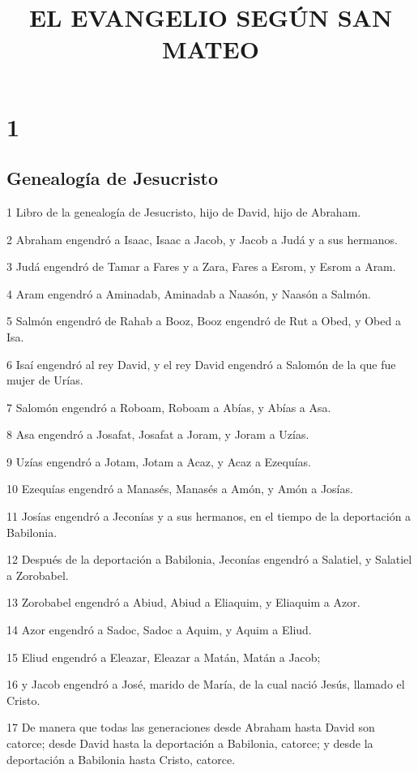 
\title{EL EVANGELIO SEGÚN SAN MATEO}

\chapter{1}

\section*{Genealogía de Jesucristo}

\par 1 Libro de la genealogía de Jesucristo, hijo de David, hijo de Abraham.
\par 2 Abraham engendró a Isaac, Isaac a Jacob, y Jacob a Judá y a sus hermanos.
\par 3 Judá engendró de Tamar a Fares y a Zara, Fares a Esrom, y Esrom a Aram.
\par 4 Aram engendró a Aminadab, Aminadab a Naasón, y Naasón a Salmón.
\par 5 Salmón engendró de Rahab a Booz, Booz engendró de Rut a Obed, y Obed a Isa.
\par 6 Isaí engendró al rey David, y el rey David engendró a Salomón de la que fue mujer de Urías.
\par 7 Salomón engendró a Roboam, Roboam a Abías, y Abías a Asa.
\par 8 Asa engendró a Josafat, Josafat a Joram, y Joram a Uzías.
\par 9 Uzías engendró a Jotam, Jotam a Acaz, y Acaz a Ezequías.
\par 10 Ezequías engendró a Manasés, Manasés a Amón, y Amón a Josías.
\par 11 Josías engendró a Jeconías y a sus hermanos, en el tiempo de la deportación a Babilonia.
\par 12 Después de la deportación a Babilonia, Jeconías engendró a Salatiel, y Salatiel a Zorobabel.
\par 13 Zorobabel engendró a Abiud, Abiud a Eliaquim, y Eliaquim a Azor.
\par 14 Azor engendró a Sadoc, Sadoc a Aquim, y Aquim a Eliud.
\par 15 Eliud engendró a Eleazar, Eleazar a Matán, Matán a Jacob;
\par 16 y Jacob engendró a José, marido de María, de la cual nació Jesús, llamado el Cristo.
\par 17 De manera que todas las generaciones desde Abraham hasta David son catorce; desde David hasta la deportación a Babilonia, catorce; y desde la deportación a Babilonia hasta Cristo, catorce.

